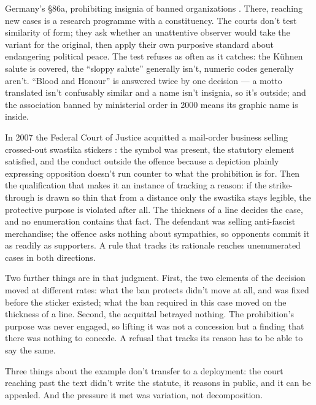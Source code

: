 
Germany's \S86a, prohibiting insignia of banned organizations \autocite{germany1998stgb}. There, reaching new cases is a research programme with a constituency. The courts don't test similarity of form; they ask whether an unattentive observer would take the variant for the original, then apply their own purposive standard about endangering political peace. The test refuses as often as it catches: the Kühnen salute is covered, the “sloppy salute” generally isn't, numeric codes generally aren't. “Blood and Honour” is answered twice by one decision \autocite{bgh2009bloodhonour} — a motto translated isn't confusably similar and a name isn't insignia, so it's outside; and the association banned by ministerial order in 2000 means its graphic name is inside.


In 2007 the Federal Court of Justice acquitted a mail-order business selling crossed-out swastika stickers \autocite{bgh2007hakenkreuz}: the symbol was present, the statutory element satisfied, and the conduct outside the offence because a depiction plainly expressing opposition doesn't run counter to what the prohibition is for. Then the qualification that makes it an instance of tracking a reason: if the strike-through is drawn so thin that from a distance only the swastika stays legible, the protective purpose is violated after all. The thickness of a line decides the case, and no enumeration contains that fact. The defendant was selling anti-fascist merchandise; the offence asks nothing about sympathies, so opponents commit it as readily as supporters. A rule that tracks its rationale reaches unenumerated cases in both directions.

Two further things are in that judgment. First, the two elements of the decision moved at different rates: what the ban protects didn't move at all, and was fixed before the sticker existed; what the ban required in this case moved on the thickness of a line. Second, the acquittal betrayed nothing. The prohibition's purpose was never engaged, so lifting it was not a concession but a finding that there was nothing to concede. A refusal that tracks its reason has to be able to say the same.

Three things about the example don't transfer to a deployment: the court reaching past the text didn't write the statute, it reasons in public, and it can be appealed. And the pressure it met was variation, not decomposition.

